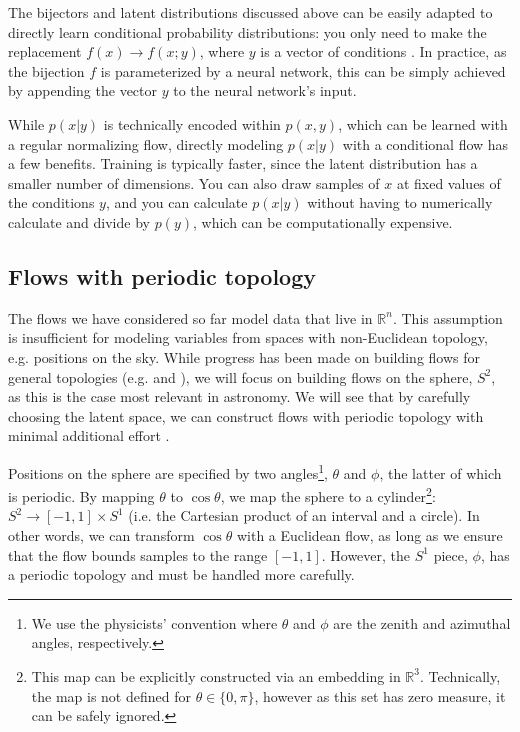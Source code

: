 \documentclass[twocolumn]{aastex631}
\newcommand{\R}{\mathbb{R}}
\begin{document}
The bijectors and latent distributions discussed above can be easily adapted to directly learn conditional probability distributions:
you only need to make the replacement $f(x) \to f(x;y)$, where $y$ is a vector of conditions \citep{winkler2019}.
In practice, as the bijection $f$ is parameterized by a neural network, this can be simply achieved by appending the vector $y$ to the neural network's input.

While $p(x|y)$ is technically encoded within $p(x,y)$, which can be learned with a regular normalizing flow, directly modeling $p(x|y)$ with a conditional flow has a few benefits.
Training is typically faster, since the latent distribution has a smaller number of dimensions.
You can also draw samples of $x$ at fixed values of the conditions $y$, and you can calculate $p(x|y)$ without having to numerically calculate and divide by $p(y)$, which can be computationally expensive.

\subsection{Flows with periodic topology}
\label{sec:periodic}

The flows we have considered so far model data that live in $\R^n$.
This assumption is insufficient for modeling variables from spaces with non-Euclidean topology, e.g. positions on the sky.
While progress has been made on building flows for general topologies (e.g. \citealt{gemici2016} and \citealt{falorsi2019}), we will focus on building flows on the sphere, $S^2$, as this is the case most relevant in astronomy.
We will see that by carefully choosing the latent space, we can construct flows with periodic topology with minimal additional effort \citep{rezende2020}.

Positions on the sphere are specified by two angles\footnote{
We use the physicists' convention where $\theta$ and $\phi$ are the zenith and azimuthal angles, respectively.
},
$\theta$ and $\phi$, the latter of which is periodic.
By mapping $\theta$ to $\cos\theta$, we map the sphere to a cylinder\footnote{
This map can be explicitly constructed via an embedding in $\R^3$.
Technically, the map is not defined for $\theta \in \{0, \pi\}$, however as this set has zero measure, it can be safely ignored.}:
$S^2 \to [-1,1] \times S^1$ (i.e. the Cartesian product of an interval and a circle).
In other words, we can transform $\cos\theta$ with a Euclidean flow, as long as we ensure that the flow bounds samples to the range $[-1, 1]$.
However, the $S^1$ piece, $\phi$, has a periodic topology and must be handled more carefully.
\end{document}
